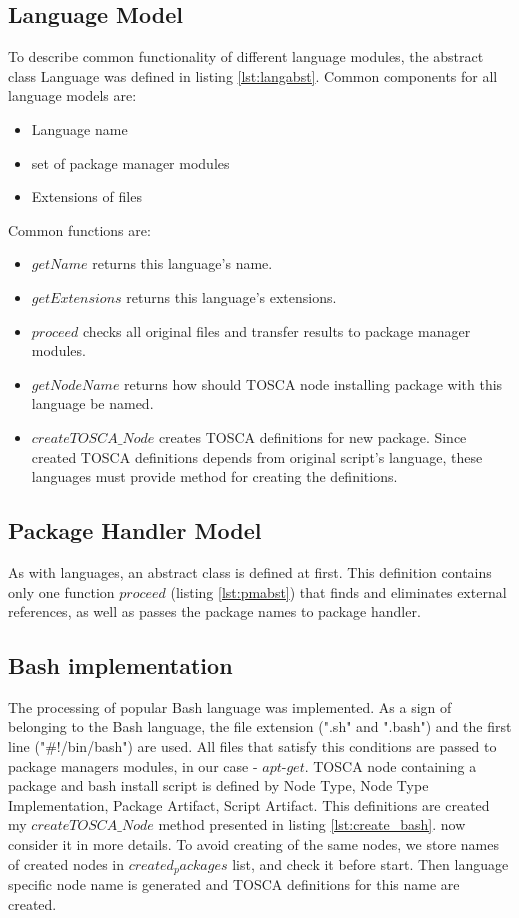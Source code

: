 \subsection*{Language Model}
To describe common functionality of different language modules, the abstract class Language was defined in listing \ref{lst:langabst}.
Common components for all language models are: 
\begin{itemize}
	\item Language name
	\item set of package manager modules
	\item Extensions of files
\end{itemize}
Common functions are: 
\begin{itemize}
	\item $getName$ returns this language's name.
	\item $getExtensions$ returns this language's extensions.
	\item $proceed$ checks all original files and transfer results to package manager modules.
	\item $getNodeName$ returns how should TOSCA node installing package with this language be named.
	\item $createTOSCA\_Node$ creates TOSCA definitions for new package. 
	Since created TOSCA definitions depends from original script's language, these languages must provide method for creating the definitions.
\end{itemize}

\subsection*{Package Handler Model}
As with languages, an abstract class is defined at first.
This definition contains only one function $proceed$ (listing \ref{lst:pmabst}) that finds and eliminates external references, as well as passes the package names to package handler.

\subsection*{Bash implementation}
The processing of popular Bash language was implemented.
As a sign of belonging to the Bash language, the file extension (".sh" and ".bash") and the first line ("\#!/bin/bash") are used. 
All files that satisfy this conditions are passed to package managers modules, in our case - $apt$-$get$. 
TOSCA node containing a package and bash install script is defined by Node Type, Node Type Implementation, Package Artifact, Script Artifact.
This definitions are created my $createTOSCA\_Node$ method presented in listing \ref{lst:create_bash}.
now consider it in more details.
To avoid creating of the same nodes, we store names of created nodes in $created_packages$ list, and check it before start.
Then language specific node name is generated and TOSCA definitions for this name are created.

